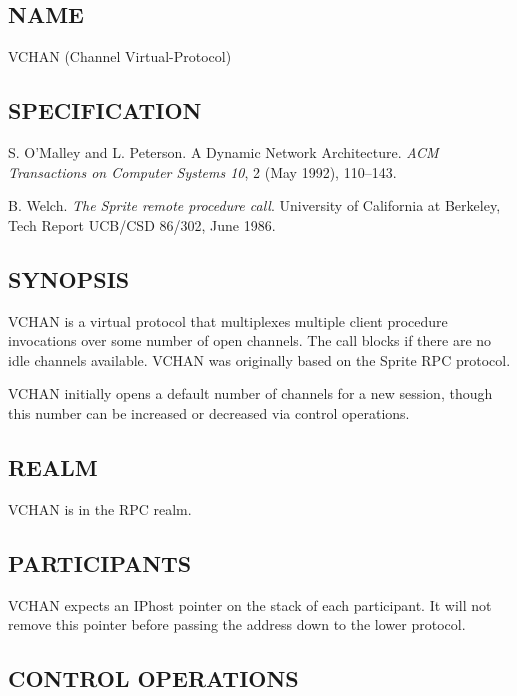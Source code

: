 \subsection*{NAME}

\noindent VCHAN (Channel Virtual-Protocol)

\subsection*{SPECIFICATION}

\noindent 
S. O'Malley and L. Peterson.  A Dynamic Network Architecture.  {\it
ACM Transactions on Computer Systems 10}, 2 (May 1992), 110--143.

\medskip
\noindent  B. Welch. {\it The Sprite remote procedure call}. 
University of California at Berkeley, Tech Report UCB/CSD 86/302,
June 1986.

\subsection*{SYNOPSIS}

\noindent VCHAN is a virtual protocol that multiplexes multiple client
procedure invocations over some number of open channels. The call
blocks if there are no idle channels available.  VCHAN was originally
based on the Sprite RPC protocol.

VCHAN initially opens a default number of channels for a new session,
though this number can be increased or decreased via control
operations. 

\subsection*{REALM}

VCHAN is in the RPC realm.


\subsection*{PARTICIPANTS}

VCHAN expects an IPhost pointer on the stack of each participant.  It
will not remove this pointer before passing the address down to the
lower protocol. 


\subsection*{CONTROL OPERATIONS}

